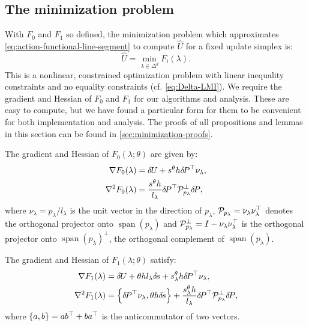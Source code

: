 \documentclass{article}
\begin{document}
\subsection{The minimization problem}\label{ssec:minimization-problem}

With $F_0$ and $F_1$ so defined, the minimization problem which
approximates \cref{eq:action-functional-line-segment} to compute
$\hat{U}$ for a fixed update simplex is:
\begin{equation}
  \label{eq:constrained-minimization}
  \hat{U} = \min_{\lambda \in \Delta^d} F_i(\lambda).
\end{equation}
This is a nonlinear, constrained optimization problem with linear
inequality constraints and no equality constraints (cf.\@
\cref{eq:Delta-LMI}). We require the gradient and Hessian of $F_0$ and
$F_1$ for our algorithms and analysis. These are easy to compute, but
we have found a particular form for them to be convenient for both
implementation and analysis. The proofs of all propositions and lemmas
in this section can be found in \cref{sec:minimization-proofs}.

\begin{proposition}\label{prop:F0-grad-and-Hess}
  The gradient and Hessian of $F_0(\lambda; \theta)$ are given by:
  \begin{align}
    \nabla F_0(\lambda) &= {\delta \hspace{-0.09em} U} + s^{\theta} h {\delta \hspace{-0.14em} P}^\top \nu_\lambda,\label{eq:F0-grad} \\
    \nabla^2 F_0(\lambda) &= \frac{s^{\theta} h}{l_\lambda} {\delta \hspace{-0.14em} P}^\top \mathcal{P}^\perp_{p_\lambda} {\delta \hspace{-0.14em} P},
  \end{align}
  where $\nu_\lambda = p_\lambda/l_\lambda$ is the unit vector in the
  direction of $p_\lambda$,
  $\mathcal{P}_{p_\lambda} = \nu_\lambda \nu_\lambda^\top$ denotes the
  orthogonal projector onto $\operatorname{span}(p_\lambda)$ and
  $\mathcal{P}_{p_\lambda}^\perp = I - \nu_\lambda \nu_\lambda^\top$ is the
  orthogonal projector onto $\operatorname{span}(p_\lambda)^\perp$,
  the orthogonal complement of $\operatorname{span}(p_\lambda)$.
\end{proposition}

\begin{proposition}\label{prop:F1-grad-and-Hess}
  The gradient and Hessian of $F_1(\lambda; \theta)$ satisfy:
  \begin{align}
    \nabla F_1(\lambda) &= {\delta \hspace{-0.09em} U} + \theta h l_\lambda {\delta \hspace{-0.1em} s} + s^{\theta}_\lambda h {\delta \hspace{-0.14em} P}^\top \nu_\lambda, \\
    \nabla^2 F_1(\lambda) &= \left\{{\delta \hspace{-0.14em} P}^\top \nu_\lambda, \theta h {\delta \hspace{-0.1em} s}\right\} + \frac{s^\theta_\lambda h}{l_\lambda} {\delta \hspace{-0.14em} P}^\top \mathcal{P}^\perp_{p_\lambda} {\delta \hspace{-0.14em} P}, \label{eq:hess-F1}
  \end{align}
  where $\left\{a, b\right\} = ab^\top + ba^\top$ is the anticommutator of two
  vectors.
\end{proposition}
\end{document}
